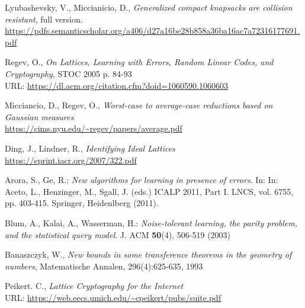 \begin{thebibliography}{99}
 Lyubashevsky, V., Miccianicio, D., \emph{Generalized compact knapsacks are collision resistant}, full version.\\
\url{https://pdfs.semanticscholar.org/a406/d27a16be28b858a36ba16ac7a72316177691.pdf}

 Regev, O., \emph{On Lattices, Learning with Errors, Random Linear Codes, and Cryptography}, STOC 2005 p. 84-93\\
URL: \url{https://dl.acm.org/citation.cfm?doid=1060590.1060603}

 Micciancio, D., Regev, O., \emph{Worst-case to average-case reductions based on Gaussian measures}\\\url{https://cims.nyu.edu/~regev/papers/average.pdf}

 Ding, J., Lindner, R., \emph{Identifying Ideal Lattices} \\\url{https://eprint.iacr.org/2007/322.pdf}

 Arora, S., Ge, R.: \emph{New algorithms for learning in presence of errors}. In: In: Aceto, L., Henzinger, M., Sgall, J. (eds.) ICALP 2011, Part I. LNCS, vol. 6755, pp. 403-415. Springer, Heidenlberg (2011).

 Blum, A., Kalai, A., Wasserman, H.: \emph{Noise-tolerant learning, the parity problem, and the statistical query model}. J. ACM \textbf{50}(4), 506-519 (2003)

 Banaszczyk, W., \emph{New bounds in some transference theorems in the geometry of numbers}, Matematische Annalen, 296(4):625-635, 1993

 Peikert. C., \emph{Lattice Cryptography for the Internet} \\
URL: \url{https://web.eecs.umich.edu/~cpeikert/pubs/suite.pdf}

\end{thebibliography}